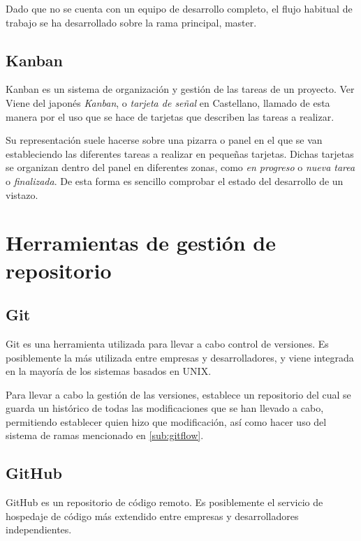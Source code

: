 Dado que no se cuenta con un equipo de desarrollo completo, el flujo habitual de trabajo se ha desarrollado sobre la rama principal, master. 

\subsection{Kanban}
\label{sub:Kanban}

Kanban es un sistema de organización y gestión de las tareas de un proyecto. Ver \citep{wiki:Kanban}
Viene del japonés \textit{Kanban}, o \textit{tarjeta de señal} en Castellano, llamado de esta manera por el uso que se hace de tarjetas que describen las tareas a realizar. 

Su representación suele hacerse sobre una pizarra o panel en el que se van estableciendo las diferentes tareas a realizar en pequeñas tarjetas. Dichas tarjetas se organizan dentro del panel en diferentes zonas, como \textit{en progreso} o \textit{nueva tarea} o \textit{finalizada}. 
De esta forma es sencillo comprobar el estado del desarrollo de un vistazo. 

\section{Herramientas de gestión de repositorio}

\subsection{Git}

Git es una herramienta utilizada para llevar a cabo control de versiones. Es posiblemente la más utilizada entre empresas y desarrolladores, y viene integrada en la mayoría de los sistemas basados en UNIX.

Para llevar a cabo la gestión de las versiones, establece un repositorio del cual se guarda un histórico de todas las modificaciones que se han llevado a cabo, permitiendo establecer quien hizo que modificación, así como hacer uso del sistema de ramas mencionado en \ref{sub:gitflow}. 

\subsection{GitHub}

GitHub es un repositorio de código remoto. Es posiblemente el servicio de hospedaje de código más extendido entre empresas y desarrolladores independientes. \citep{wiki:GitHub}

